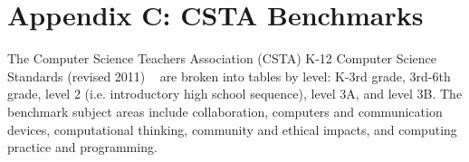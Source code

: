 
\chapter{Appendix C: CSTA Benchmarks} %

\label{AppendixCSTA} %

The Computer Science Teachers Association (CSTA) K-12 Computer Science Standards (revised 2011) ~\cite{csta} are broken into tables by level: K-3rd grade, 3rd-6th grade, level 2 (i.e. introductory high school sequence), level 3A, and level 3B. The benchmark subject areas include collaboration, computers and communication devices, computational thinking, community and ethical impacts, and computing practice and programming. \par 
